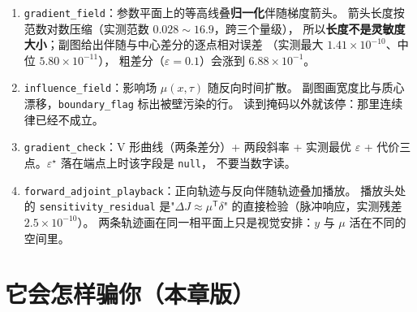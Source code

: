 \begin{enumerate}
  \item \texttt{gradient\_field}：参数平面上的等高线叠\textbf{归一化}伴随梯度箭头。
        箭头长度按范数对数压缩（实测范数 $0.028\sim16.9$，跨三个量级），
        所以\textbf{长度不是灵敏度大小}；副图给出伴随与中心差分的逐点相对误差
        （实测最大 $1.41\times10^{-10}$、中位 $5.80\times10^{-11}$），
        粗差分（$\varepsilon=0.1$）会涨到 $6.88\times10^{-1}$。
  \item \texttt{influence\_field}：影响场 $\mu(x,\tau)$ 随反向时间扩散。
        副图画宽度比与质心漂移，\texttt{boundary\_flag} 标出被壁污染的行。
        读到掩码以外就该停：那里连续律已经不成立。
  \item \texttt{gradient\_check}：V 形曲线（两条差分）+ 两段斜率 + 实测最优
        $\varepsilon$ + 代价三点。$\varepsilon^\star$ 落在端点上时该字段是 \texttt{null}，
        不要当数字读。
  \item \texttt{forward\_adjoint\_playback}：正向轨迹与反向伴随轨迹叠加播放。
        播放头处的 \texttt{sensitivity\_residual} 是"$\Delta J\approx\mu^{\mathsf T}\delta$"
        的直接检验（脉冲响应，实测残差 $2.5\times10^{-10}$）。
        两条轨迹画在同一相平面上只是视觉安排：$y$ 与 $\mu$ 活在不同的空间里。
\end{enumerate}



\section{它会怎样骗你（本章版）}

